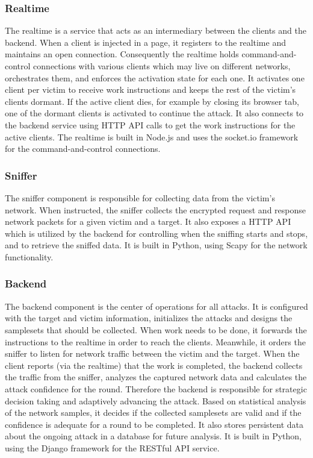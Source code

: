 \subsubsection{Realtime}

The realtime is a service that acts as an intermediary between the clients and
the backend. When a client is injected in a page, it registers to the realtime and
maintains an open connection. Consequently the realtime holds command-and-control
connections with various clients which may live on different networks,
orchestrates them, and enforces the activation state for each one. It
activates one client per victim to receive work instructions and keeps the rest of
the victim's clients dormant. If the active client dies, for example by closing
its browser tab, one of the dormant clients is activated to continue the
attack. It also connects to the backend service using HTTP API calls to get
the work instructions for the active clients. The realtime is built in
Node.js \cite{tilkov2010node} and uses the socket.io framework
\cite{rai2013socket} for the command-and-control connections.

\subsubsection{Sniffer}

The sniffer component is responsible for collecting data from the victim's
network. When instructed, the sniffer collects the encrypted request and
response network packets for a given victim and a target. It also exposes a HTTP
API which is utilized by the backend for controlling when the sniffing starts and
stops, and to retrieve the sniffed data. It is built in Python, using Scapy
\cite{biondi2010scapy} for the network functionality.

\subsubsection{Backend}

The backend component is the center of operations for all attacks. It is
configured with the target and victim information, initializes the attacks and
designs the samplesets that should be collected.  When work needs to be done,
it forwards the instructions to the realtime in order to reach the clients. Meanwhile, it
orders the sniffer to listen for network traffic between the victim and the
target. When the client reports (via the realtime) that the work is completed, the
backend collects the traffic from the sniffer, analyzes the captured network
data and calculates the attack confidence for the round.
Therefore the backend is responsible for strategic decision taking and
adaptively advancing the attack. Based on statistical analysis of the network
samples, it decides if the collected samplesets are valid and if the confidence
is adequate for a round to be completed. It also stores persistent data about
the ongoing attack in a database for future analysis. It is built in Python,
using the Django framework for the RESTful API service.
